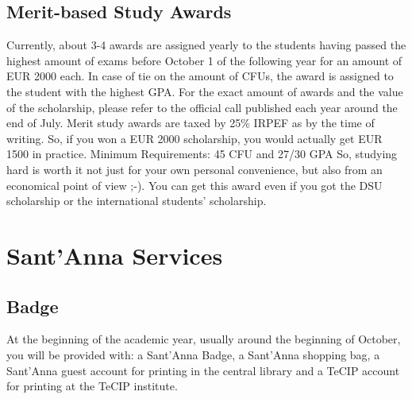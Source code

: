 \documentclass[11pt,fleqn,oneside]{book} %
\begin{document}
\section{Merit-based Study Awards}
Currently, about 3-4 awards are assigned yearly to the students having passed the highest amount of exams before October 1 of the following year for an amount of EUR 2000 each. In case of tie on the amount of CFUs, the award is assigned to the student with the highest GPA. For the exact amount of awards and the value of the scholarship, please refer to the official call published each year around the end of July. Merit study awards are taxed by 25\% IRPEF as by the time of writing. So, if you  won a EUR 2000 scholarship, you would actually get EUR 1500 in practice. 
Minimum Requirements: 45 CFU and 27/30 GPA
So, studying hard is worth it not just for your own personal convenience, but also from an economical point of view ;-). You can get this award even if you got the DSU scholarship or the international students’ scholarship. 




\chapter{Sant'Anna Services}


\section{Badge}
At the beginning of the academic year, usually around the beginning of October, you will be provided with: a Sant’Anna Badge, a Sant’Anna shopping bag, a Sant’Anna guest account for printing in the central library and a TeCIP account for printing at the TeCIP institute. 

\end{document}
